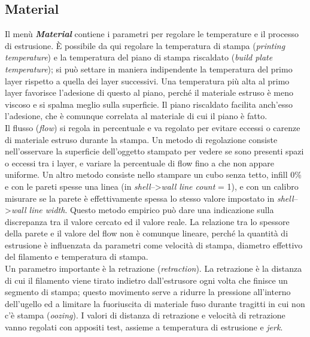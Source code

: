 \subsection{Material}
Il menù \emph{\textbf{Material}} contiene i parametri per regolare le temperature e il processo di estrusione.
È possibile da qui regolare la temperatura di stampa (\emph{printing temperature}) e la temperatura del piano di stampa riscaldato (\emph{build plate temperature}); si può settare in maniera indipendente la temperatura del primo layer rispetto a quella dei layer successivi. Una temperatura più alta al primo layer favorisce l'adesione di questo al piano, perché il materiale estruso è meno viscoso e si spalma meglio sulla superficie. Il piano riscaldato facilita anch'esso l'adesione, che è comunque correlata al materiale di cui il piano è fatto.\\
Il flusso (\emph{flow}) si regola in percentuale e va regolato per evitare eccessi o carenze di materiale estruso durante la stampa. Un metodo di regolazione consiste nell'osservare la superficie dell'oggetto stampato per vedere se sono presenti spazi o eccessi tra i layer, e variare la percentuale di flow fino a che non appare uniforme. Un altro metodo consiste nello stampare un cubo senza tetto, infill 0\% e con le pareti spesse una linea (in \emph{shell}-->\emph{wall line count} = 1), e con un calibro misurare se la parete è effettivamente spessa lo stesso valore impostato in \emph{shell}-->\emph{wall line width}.
Questo metodo empirico può dare una indicazione sulla discrepanza tra il valore cercato ed il valore reale. La relazione tra lo spessore della parete e il valore del flow non è comunque lineare, perché la quantità di estrusione è influenzata da parametri come velocità di stampa, diametro effettivo del filamento e temperatura di stampa.\\
Un parametro importante è la retrazione (\emph{retraction}). La retrazione è la distanza di cui il filamento viene tirato indietro dall'estrusore ogni volta che finisce un segmento di stampa; questo movimento serve a ridurre la pressione all'interno dell'ugello ed a limitare la fuoriuscita di materiale fuso durante tragitti in cui non c'è stampa (\emph{oozing}). I valori di distanza di retrazione e velocità di retrazione vanno regolati con appositi test, assieme a temperatura di estrusione e \emph{jerk}.

